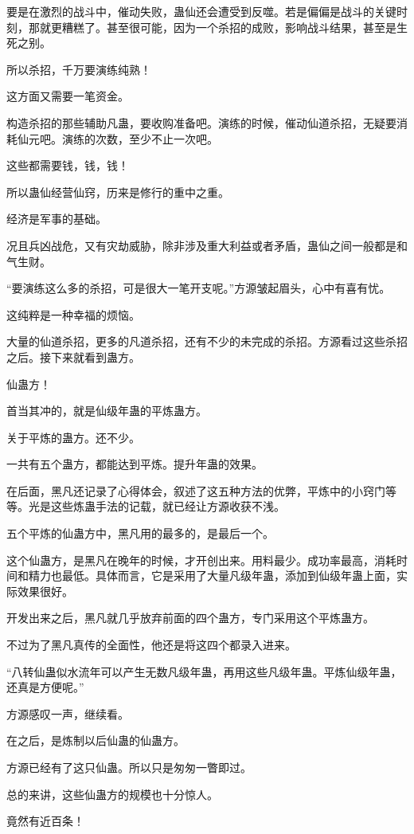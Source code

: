 \begin{this_body}
要是在激烈的战斗中，催动失败，蛊仙还会遭受到反噬。若是偏偏是战斗的关键时刻，那就更糟糕了。甚至很可能，因为一个杀招的成败，影响战斗结果，甚至是生死之别。

所以杀招，千万要演练纯熟！

这方面又需要一笔资金。

构造杀招的那些辅助凡蛊，要收购准备吧。演练的时候，催动仙道杀招，无疑要消耗仙元吧。演练的次数，至少不止一次吧。

这些都需要钱，钱，钱！

所以蛊仙经营仙窍，历来是修行的重中之重。

经济是军事的基础。

况且兵凶战危，又有灾劫威胁，除非涉及重大利益或者矛盾，蛊仙之间一般都是和气生财。

“要演练这么多的杀招，可是很大一笔开支呢。”方源皱起眉头，心中有喜有忧。

这纯粹是一种幸福的烦恼。

大量的仙道杀招，更多的凡道杀招，还有不少的未完成的杀招。方源看过这些杀招之后。接下来就看到蛊方。

仙蛊方！

首当其冲的，就是仙级年蛊的平炼蛊方。

关于平炼的蛊方。还不少。

一共有五个蛊方，都能达到平炼。提升年蛊的效果。

在后面，黑凡还记录了心得体会，叙述了这五种方法的优弊，平炼中的小窍门等等。光是这些炼蛊手法的记载，就已经让方源收获不浅。

五个平炼的仙蛊方中，黑凡用的最多的，是最后一个。

这个仙蛊方，是黑凡在晚年的时候，才开创出来。用料最少。成功率最高，消耗时间和精力也最低。具体而言，它是采用了大量凡级年蛊，添加到仙级年蛊上面，实际效果很好。

开发出来之后，黑凡就几乎放弃前面的四个蛊方，专门采用这个平炼蛊方。

不过为了黑凡真传的全面性，他还是将这四个都录入进来。

“八转仙蛊似水流年可以产生无数凡级年蛊，再用这些凡级年蛊。平炼仙级年蛊，还真是方便呢。”

方源感叹一声，继续看。

在之后，是炼制以后仙蛊的仙蛊方。

方源已经有了这只仙蛊。所以只是匆匆一瞥即过。

总的来讲，这些仙蛊方的规模也十分惊人。

竟然有近百条！


\end{this_body}
